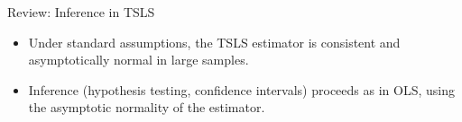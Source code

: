 \documentclass[dvipsnames,hyperref={pdfpagelabels=false}]{beamer}
\begin{document}
%
%
%
%
%
%




\begin{frame}{Review: Inference in TSLS}
	\begin{itemize}
		\item Under standard assumptions, the TSLS estimator is consistent and asymptotically normal in large samples.
		\vspace{0.3cm}
		\item Inference (hypothesis testing, confidence intervals) proceeds as in OLS, using the asymptotic normality of the estimator.
	\end{itemize}
\end{frame}
\end{document}
